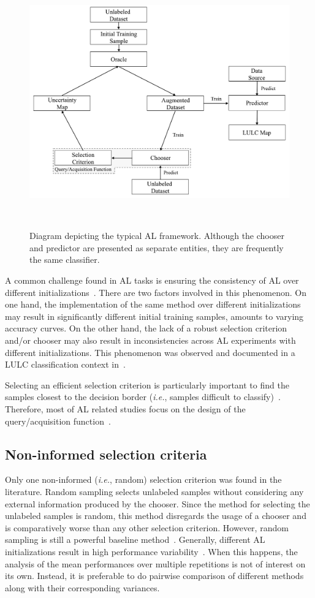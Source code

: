 \documentclass[parskip=full]{scrartcl}
\begin{document}
\begin{figure}[htb]
	\centering
	\includegraphics[width=.85\linewidth]{../analysis/al_typical}
	\caption{Diagram depicting the typical AL framework. Although the chooser
        and predictor are presented as separate entities, they are frequently
        the same classifier.
    }~\label{fig:al_typical}
\end{figure}

A common challenge found in AL tasks is ensuring the consistency of AL over
different initializations~\cite{Kottke2017}. There are two factors involved in
this phenomenon. On one hand, the implementation of the same method over
different initializations may result in significantly different initial
training samples, amounts to varying accuracy curves. On the other hand, the
lack of a robust selection criterion and/or chooser may also result in
inconsistencies across AL experiments with different initializations. This
phenomenon was observed and documented in a LULC classification context
in~\cite{tuia2011using}.

Selecting an efficient selection criterion is particularly important to find
the samples closest to the decision border (\textit{i.e.}, samples difficult to
classify)~\cite{Shrivastava2021}. Therefore, most of AL related studies focus
on the design of the query/acquisition function~\cite{Su2020}.

\subsection{Non-informed selection criteria}

Only one non-informed (\textit{i.e.}, random) selection criterion was found in
the literature. Random sampling selects unlabeled samples without considering
any external information produced by the chooser. Since the method for
selecting the unlabeled samples is random, this method disregards the usage of
a chooser and is comparatively worse than any other selection criterion.
However, random sampling is still a powerful baseline
method~\cite{Cawley2011}. Generally, different AL initializations result in
high performance variability~\cite{Kottke2017}. When this happens, the
analysis of the mean performances over multiple repetitions is not of interest
on its own. Instead, it is preferable to do pairwise comparison of different
methods along with their corresponding variances. 
\end{document}
